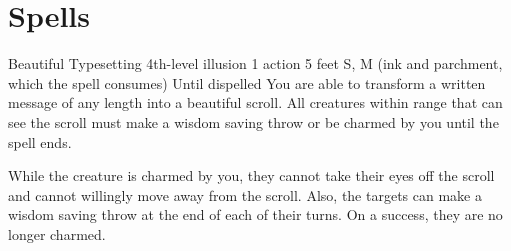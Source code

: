 \documentclass[letterpaper,10pt,twoside,twocolumn,openany]{dndbook}
\begin{document}
\section{Spells}

\begin{spell}
  {Beautiful Typesetting}
  {4th-level illusion}
  {1 action}
  {5 feet}
  {S, M (ink and parchment, which the spell consumes)}
  {Until dispelled}
  You are able to transform a written message of any length into a beautiful scroll. All creatures within range that can see the scroll must make a wisdom saving throw or be charmed by you until the spell ends.

  While the creature is charmed by you, they cannot take their eyes off the scroll and cannot willingly move away from the scroll. Also, the targets can make a wisdom saving throw at the end of each of their turns. On a success, they are no longer charmed.
\end{spell}

\lipsum[2]
\end{document}
